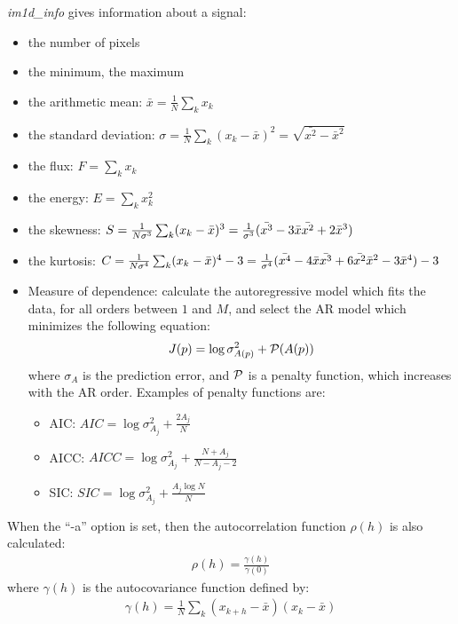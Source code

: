 {\em im1d\_info} gives information about a signal:
\begin{itemize}
\baselineskip=0.4truecm
\itemsep=0.1truecm
\item the number of pixels
\item the minimum, the maximum 
\item the arithmetic mean: $  {\bar x} = \frac{1}{N}\sum_k x_k$
\item the standard deviation: $\sigma = \frac{1}{N} \sum_k (x_k - {\bar x})^2 = \sqrt{{\bar {x^2}} - {\bar x}^2}$
\item the flux: $F  = \sum_k x_k$
\item the energy: $E = \sum_k x_k^2$
\item the skewness: 
$
S  =   \frac{1}{N \sigma^3}\sum_k (x_k - {\bar x})^3  
        =   \frac{1}{\sigma^3} ({\Bar {x^3}} - 3 {\bar x}{\Bar {x^2}} + 2{\bar x}^3)
$ \\
\item the kurtosis:
$
C  =   \frac{1}{N \sigma^4}\sum_k (x_k - {\bar x})^4 - 3 
   =  \frac{1}{\sigma^4} ({\Bar {x^4}} - 4 {\bar x}{\Bar {x^3}} + 6 {\Bar {x^2}}{\bar x}^2 - 3 {\bar x}^4) - 3
$ \\
\item Measure of dependence: calculate the autoregressive model  
which fits the data, for all orders between $1$ and $M$, and select the 
AR model which minimizes the following equation: 
\begin{eqnarray*}
J(p) = \log \sigma_{A(p)}^2 + {\cal P}(A(p))
\end{eqnarray*}
where $\sigma_{A}$ is the prediction error, and
${\cal P}$ is a penalty function, which increases with the AR order.
Examples of penalty functions are:
\begin{itemize}
\item AIC: $AIC = \log \sigma_{A_j}^2 + \frac{2 A_j}{N}$ 
\item AICC: $AICC = \log \sigma_{A_j}^2 + \frac{N +  A_j}{N - A_j - 2}$
\item SIC: $SIC = \log \sigma_{A_j}^2 + \frac{ A_j\log N }{N}$
\end{itemize}
\end{itemize}
When the ``-a'' option is set, then the  autocorrelation function $\rho(h)$
is also calculated:
\begin{eqnarray}
\rho(h) = \frac{\gamma(h)}{\gamma(0)} 	
\end{eqnarray}
 where $\gamma(h)$ is the autocovariance function defined by:
 \begin{eqnarray}
 \gamma(h)= \frac{1}{N} \sum_k (x_{k+h} - {\bar x})(x_k - {\bar x})
 \end{eqnarray}

